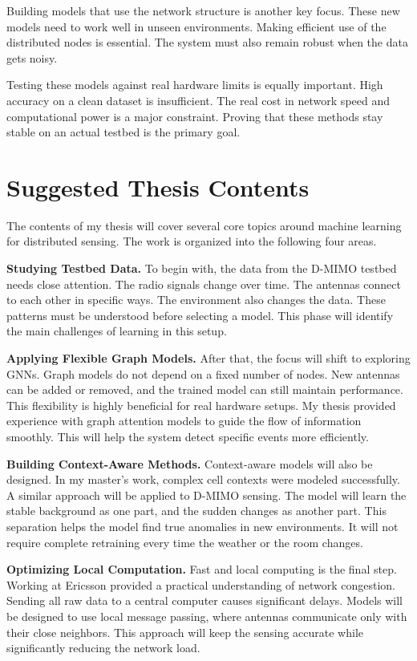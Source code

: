 \documentclass[11pt,a4paper]{article}
\begin{document}
Building models that use the network structure is another key focus. These new models need to work well in unseen environments. Making efficient use of the distributed nodes is essential. The system must also remain robust when the data gets noisy.

Testing these models against real hardware limits is equally important. High accuracy on a clean dataset is insufficient. The real cost in network speed and computational power is a major constraint. Proving that these methods stay stable on an actual testbed is the primary goal.

\section*{Suggested Thesis Contents}

The contents of my thesis will cover several core topics around machine learning for distributed sensing. The work is organized into the following four areas.

\textbf{Studying Testbed Data.} To begin with, the data from the D-MIMO testbed needs close attention. The radio signals change over time. The antennas connect to each other in specific ways. The environment also changes the data. These patterns must be understood before selecting a model. This phase will identify the main challenges of learning in this setup.

\textbf{Applying Flexible Graph Models.} After that, the focus will shift to exploring GNNs. Graph models do not depend on a fixed number of nodes. New antennas can be added or removed, and the trained model can still maintain performance. This flexibility is highly beneficial for real hardware setups. My thesis provided experience with graph attention models to guide the flow of information smoothly. This will help the system detect specific events more efficiently.

\textbf{Building Context-Aware Methods.} Context-aware models will also be designed. In my master's work, complex cell contexts were modeled successfully. A similar approach will be applied to D-MIMO sensing. The model will learn the stable background as one part, and the sudden changes as another part. This separation helps the model find true anomalies in new environments. It will not require complete retraining every time the weather or the room changes.

\textbf{Optimizing Local Computation.} Fast and local computing is the final step. Working at Ericsson provided a practical understanding of network congestion. Sending all raw data to a central computer causes significant delays. Models will be designed to use local message passing, where antennas communicate only with their close neighbors. This approach will keep the sensing accurate while significantly reducing the network load.
\end{document}

